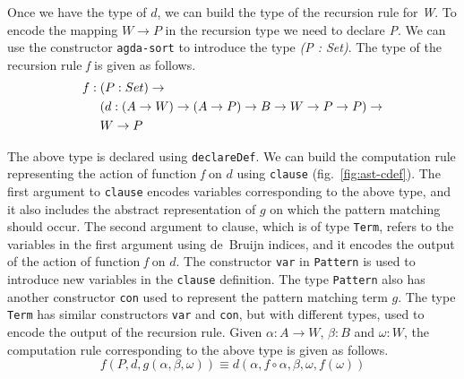 \documentclass[sigplan,10pt]{acmart}
\begin{document}
Once we have the type of $d$, we can build the type of the recursion rule for \emph{W}. To encode the mapping $W \rightarrow P$ in the recursion type we need to declare \emph{P}. We can use the constructor {\tt agda-sort} to introduce the type \emph{(P : Set)}. The type of the recursion rule \emph{f} is given as follows.
\begin{align}
& f : (P : Set) \rightarrow  \nonumber \\
& \hspace {0.5cm} (d : (A \rightarrow W) \rightarrow (A \rightarrow P) \rightarrow B \rightarrow W \rightarrow P \rightarrow P) \rightarrow \nonumber \\  
& \hspace {0.5cm} W \rightarrow P \nonumber
\end{align}
 
The above type is declared using {\tt declareDef}. We can build the computation rule representing the action of function \emph{f} on $d$ using {\tt clause} (fig.~\ref{fig:ast-cdef}). The first argument to {\tt clause} encodes variables corresponding to the above type, and it also includes the abstract representation of $g$ on which the pattern matching should occur. The second argument to clause, which is of type {\tt Term}, refers to the variables in the first argument using de~Bruijn indices, and it encodes the output of the action of function \emph{f} on $d$. The constructor {\tt var} in {\tt Pattern} is used to introduce new variables in the {\tt clause} definition. The type {\tt Pattern} also has another constructor {\tt con} used to represent the pattern matching term $g$. The type {\tt Term} has similar constructors {\tt var} and {\tt con}, but with different types, used to encode the output of the recursion rule. Given $\alpha : A \rightarrow W$, $\beta : B$ and $\omega : W$, the computation rule corresponding to the above type is given as follows.
\begin{equation}
f (P, d, g (\alpha, \beta, \omega)) \equiv d (\alpha, f \circ \alpha, \beta, \omega, f (\omega)) \nonumber
\end{equation}
\end{document}
